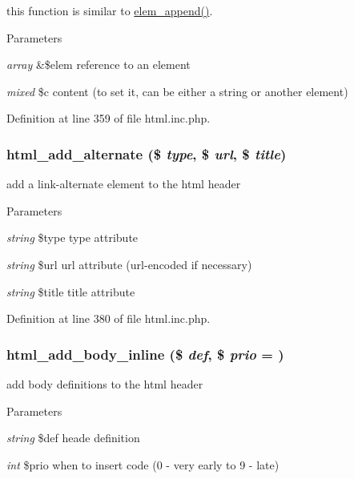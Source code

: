 this function is similar to \hyperlink{html_8inc_8php_aea37c451f5d55e2efbb2656e340c1dae}{elem\_\-append()}. 
\begin{DoxyParams}{Parameters}
\item[{\em array}]\&\$elem reference to an element \item[{\em mixed}]\$c content (to set it, can be either a string or another element) \end{DoxyParams}


Definition at line 359 of file html.inc.php.

\hypertarget{html_8inc_8php_ae013e8f0bdd681184ee1873a1964c454}{
\subsubsection[{html\_\-add\_\-alternate}]{\setlength{\rightskip}{0pt plus 5cm}html\_\-add\_\-alternate (\$ {\em type}, \/  \$ {\em url}, \/  \$ {\em title})}}
\label{html_8inc_8php_ae013e8f0bdd681184ee1873a1964c454}
add a link-\/alternate element to the html header


\begin{DoxyParams}{Parameters}
\item[{\em string}]\$type type attribute \item[{\em string}]\$url url attribute (url-\/encoded if necessary) \item[{\em string}]\$title title attribute \end{DoxyParams}


Definition at line 380 of file html.inc.php.

\hypertarget{html_8inc_8php_a2f59375f9b3aac2cf9ab8968cca33e17}{
\subsubsection[{html\_\-add\_\-body\_\-inline}]{\setlength{\rightskip}{0pt plus 5cm}html\_\-add\_\-body\_\-inline (\$ {\em def}, \/  \$ {\em prio} = {})}}
\label{html_8inc_8php_a2f59375f9b3aac2cf9ab8968cca33e17}
add body definitions to the html header


\begin{DoxyParams}{Parameters}
\item[{\em string}]\$def heade definition \item[{\em int}]\$prio when to insert code (0 -\/ very early to 9 -\/ late) \end{DoxyParams}


